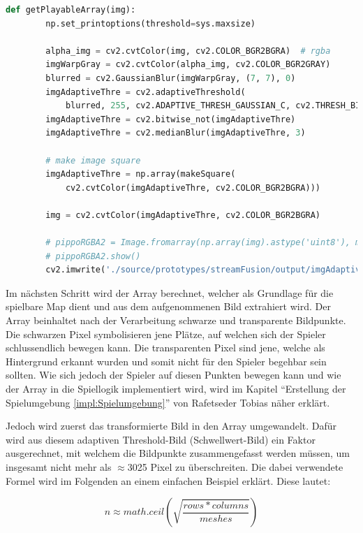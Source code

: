 \begin{lstlisting}[language=Python,caption=Bild in Spielbare Map umwandeln,label=lst:umsetzung:getplayablearray]
    def getPlayableArray(img):
        np.set_printoptions(threshold=sys.maxsize)

        alpha_img = cv2.cvtColor(img, cv2.COLOR_BGR2BGRA)  # rgba
        imgWarpGray = cv2.cvtColor(alpha_img, cv2.COLOR_BGR2GRAY)
        blurred = cv2.GaussianBlur(imgWarpGray, (7, 7), 0)
        imgAdaptiveThre = cv2.adaptiveThreshold(
            blurred, 255, cv2.ADAPTIVE_THRESH_GAUSSIAN_C, cv2.THRESH_BINARY_INV, 7, 2)
        imgAdaptiveThre = cv2.bitwise_not(imgAdaptiveThre)
        imgAdaptiveThre = cv2.medianBlur(imgAdaptiveThre, 3)

        # make image square
        imgAdaptiveThre = np.array(makeSquare(
            cv2.cvtColor(imgAdaptiveThre, cv2.COLOR_BGR2BGRA)))

        img = cv2.cvtColor(imgAdaptiveThre, cv2.COLOR_BGR2BGRA)

        # pippoRGBA2 = Image.fromarray(np.array(img).astype('uint8'), mode='RGBA')
        # pippoRGBA2.show()
        cv2.imwrite('./source/prototypes/streamFusion/output/imgAdaptiveThre.png', imgAdaptiveThre)
\end{lstlisting}

Im nächsten Schritt wird der Array berechnet, welcher als Grundlage für die spielbare Map dient und aus dem aufgenommenen Bild extrahiert wird. Der Array beinhaltet nach der Verarbeitung schwarze und transparente Bildpunkte. Die schwarzen Pixel symbolisieren jene Plätze, auf welchen sich der Spieler schlussendlich bewegen kann. Die transparenten Pixel sind jene, welche als Hintergrund erkannt wurden und somit nicht für den Spieler begehbar sein sollten. Wie sich jedoch der Spieler auf diesen Punkten bewegen kann und wie der Array in die Spiellogik implementiert wird, wird im Kapitel ``Erstellung der Spielumgebung \ref{impl:Spielumgebung}'' von Rafetseder Tobias näher erklärt.

Jedoch wird zuerst das transformierte Bild in den Array umgewandelt. Dafür wird aus diesem adaptiven Threshold-Bild (Schwellwert-Bild) ein Faktor ausgerechnet, mit welchem die Bildpunkte zusammengefasst werden müssen, um insgesamt nicht mehr als \(\approx\)3025 Pixel zu überschreiten. Die dabei verwendete Formel wird im Folgenden an einem einfachen Beispiel erklärt. Diese lautet:

\[
    n \approx math.ceil(\sqrt{ \frac{ rows * columns }{ meshes } })
\]

